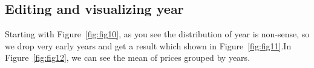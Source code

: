 \documentclass[onecolumn]{article}
\begin{document}
\subsection{Editing and visualizing year}
Starting with Figure~\ref{fig:fig10}, as you see the distribution of year is non-sense, so we drop very early years and get a result which shown in Figure~\ref{fig:fig11}.In Figure~\ref{fig:fig12}, we can see the mean of prices grouped by years.


\begin{figure}[H]
\centering
{}
\caption{}
\end{figure}
\end{document}
